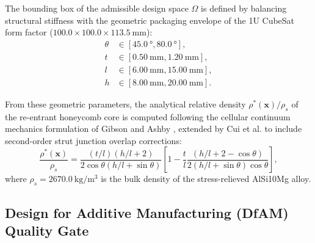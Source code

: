 The bounding box of the admissible design space $\Omega$ is defined by balancing structural stiffness with the geometric packaging envelope of the 1U CubeSat form factor ($100.0 \times 100.0 \times \SI{113.5}{\milli\meter}$):
\begin{align}
\theta &\in [\SI{45.0}{\degree}, \SI{80.0}{\degree}], \label{eq:bound_theta} \\
t &\in [\SI{0.50}{\milli\meter}, \SI{1.20}{\milli\meter}], \label{eq:bound_t} \\
l &\in [\SI{6.00}{\milli\meter}, \SI{15.00}{\milli\meter}], \label{eq:bound_l} \\
h &\in [\SI{8.00}{\milli\meter}, \SI{20.00}{\milli\meter}]. \label{eq:bound_h}
\end{align}

From these geometric parameters, the analytical relative density $\rho^*(\mathbf{x})/\rho_s$ of the re-entrant honeycomb core is computed following the cellular continuum mechanics formulation of Gibson and Ashby \cite{gibson1997}, extended by Cui et al. \cite{cui2025} to include second-order strut junction overlap corrections:
\begin{equation}
\frac{\rho^*(\mathbf{x})}{\rho_s} = \frac{(t/l)(h/l + 2)}{2\cos\theta (h/l + \sin\theta)} \left[ 1 - \frac{t}{l} \frac{(h/l + 2 - \cos\theta)}{2(h/l + \sin\theta)\cos\theta} \right],
\label{eq:relative_density_doe}
\end{equation}
where $\rho_s = \SI{2670.0}{\kilo\gram/\meter^3}$ is the bulk density of the stress-relieved AlSi10Mg alloy.

\subsection{Design for Additive Manufacturing (DfAM) Quality Gate}


